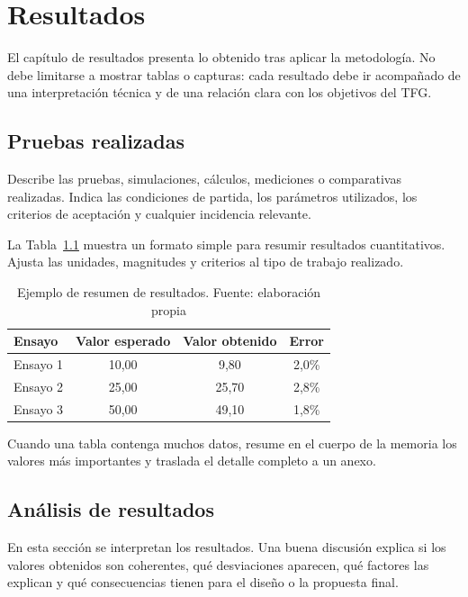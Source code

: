 \chapter{Resultados}
\label{cap:resultados}

El capítulo de resultados presenta lo obtenido tras aplicar la metodología. No
debe limitarse a mostrar tablas o capturas: cada resultado debe ir acompañado de
una interpretación técnica y de una relación clara con los objetivos del TFG.

\section{Pruebas realizadas}
\label{sec:pruebas-realizadas}

Describe las pruebas, simulaciones, cálculos, mediciones o comparativas
realizadas. Indica las condiciones de partida, los parámetros utilizados, los
criterios de aceptación y cualquier incidencia relevante.

La Tabla~\ref{tab:resultados-ejemplo} muestra un formato simple para resumir
resultados cuantitativos. Ajusta las unidades, magnitudes y criterios al tipo de
trabajo realizado.

\begin{table}[!ht]
    \footnotesize
    \centering
    \caption[Ejemplo de resumen de resultados]{Ejemplo de resumen de resultados. Fuente: elaboración propia}
    \label{tab:resultados-ejemplo}
    \begin{tabular}{lccc}
        \toprule
        \textbf{Ensayo} & \textbf{Valor esperado} & \textbf{Valor obtenido} & \textbf{Error} \\
        \midrule
        Ensayo 1 & 10,00 & 9,80 & 2,0\% \\
        Ensayo 2 & 25,00 & 25,70 & 2,8\% \\
        Ensayo 3 & 50,00 & 49,10 & 1,8\% \\
        \bottomrule
    \end{tabular}
\end{table}

Cuando una tabla contenga muchos datos, resume en el cuerpo de la memoria los
valores más importantes y traslada el detalle completo a un anexo.

\section{Análisis de resultados}
\label{sec:analisis-resultados}

En esta sección se interpretan los resultados. Una buena discusión explica si
los valores obtenidos son coherentes, qué desviaciones aparecen, qué factores
las explican y qué consecuencias tienen para el diseño o la propuesta final.

